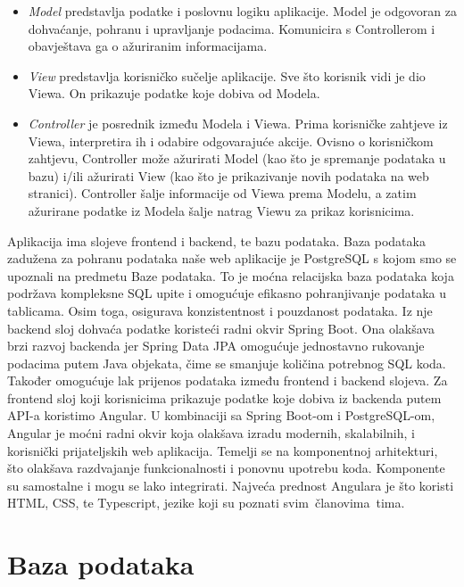 		\begin{itemize}
			\item \textit{Model} predstavlja podatke i poslovnu logiku aplikacije. Model je odgovoran za dohvaćanje, pohranu i upravljanje podacima. Komunicira s Controllerom i obavještava ga o ažuriranim informacijama.
			
			\item \textit{View} predstavlja korisničko sučelje aplikacije. Sve što korisnik vidi je dio Viewa. On prikazuje podatke koje dobiva od Modela.
			
			\item \textit{Controller} je posrednik između Modela i Viewa. Prima korisničke zahtjeve iz Viewa, interpretira ih i odabire odgovarajuće akcije. Ovisno o korisničkom zahtjevu, Controller može ažurirati Model (kao što je spremanje podataka u bazu) i/ili ažurirati View (kao što je prikazivanje novih podataka na web stranici). Controller šalje informacije od Viewa prema Modelu, a zatim ažurirane podatke iz Modela šalje natrag Viewu za prikaz korisnicima.
		\end{itemize}
		
		 
		Aplikacija ima slojeve frontend i backend, te bazu podataka. Baza podataka zadužena za pohranu podataka naše web aplikacije je PostgreSQL s kojom smo se upoznali na predmetu Baze podataka. To je moćna relacijska baza podataka koja podržava kompleksne SQL upite i omogućuje efikasno pohranjivanje podataka u tablicama. Osim toga, osigurava konzistentnost i pouzdanost podataka. Iz nje backend sloj dohvaća podatke koristeći radni okvir Spring Boot. Ona olakšava brzi razvoj backenda jer Spring Data JPA omogućuje jednostavno rukovanje podacima putem Java objekata, čime se smanjuje količina potrebnog SQL koda. Također omogućuje lak prijenos podataka između frontend i backend slojeva. Za frontend sloj koji korisnicima prikazuje podatke koje dobiva iz backenda putem API-a koristimo Angular. U kombinaciji sa Spring Boot-om i PostgreSQL-om, Angular je moćni radni okvir koja olakšava izradu modernih, skalabilnih, i korisnički prijateljskih web aplikacija. Temelji se na komponentnoj arhitekturi, što olakšava razdvajanje funkcionalnosti i ponovnu upotrebu koda. Komponente su samostalne i mogu se lako integrirati. Najveća prednost Angulara je što koristi HTML, CSS, te Typescript, jezike koji su poznati svim članovima tima.

		

				
		\section{Baza podataka}
			
